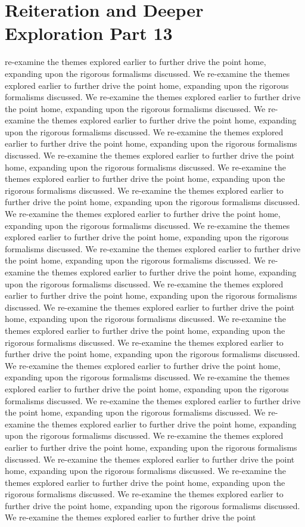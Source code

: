 \section{Reiteration and Deeper Exploration Part 13}\nWe re-examine the themes explored earlier to further drive the point home, expanding upon the rigorous formalisms discussed. We re-examine the themes explored earlier to further drive the point home, expanding upon the rigorous formalisms discussed. We re-examine the themes explored earlier to further drive the point home, expanding upon the rigorous formalisms discussed. We re-examine the themes explored earlier to further drive the point home, expanding upon the rigorous formalisms discussed. We re-examine the themes explored earlier to further drive the point home, expanding upon the rigorous formalisms discussed. We re-examine the themes explored earlier to further drive the point home, expanding upon the rigorous formalisms discussed. We re-examine the themes explored earlier to further drive the point home, expanding upon the rigorous formalisms discussed. We re-examine the themes explored earlier to further drive the point home, expanding upon the rigorous formalisms discussed. We re-examine the themes explored earlier to further drive the point home, expanding upon the rigorous formalisms discussed. We re-examine the themes explored earlier to further drive the point home, expanding upon the rigorous formalisms discussed. We re-examine the themes explored earlier to further drive the point home, expanding upon the rigorous formalisms discussed. We re-examine the themes explored earlier to further drive the point home, expanding upon the rigorous formalisms discussed. We re-examine the themes explored earlier to further drive the point home, expanding upon the rigorous formalisms discussed. We re-examine the themes explored earlier to further drive the point home, expanding upon the rigorous formalisms discussed. We re-examine the themes explored earlier to further drive the point home, expanding upon the rigorous formalisms discussed. We re-examine the themes explored earlier to further drive the point home, expanding upon the rigorous formalisms discussed. We re-examine the themes explored earlier to further drive the point home, expanding upon the rigorous formalisms discussed. We re-examine the themes explored earlier to further drive the point home, expanding upon the rigorous formalisms discussed. We re-examine the themes explored earlier to further drive the point home, expanding upon the rigorous formalisms discussed. We re-examine the themes explored earlier to further drive the point home, expanding upon the rigorous formalisms discussed. We re-examine the themes explored earlier to further drive the point home, expanding upon the rigorous formalisms discussed. We re-examine the themes explored earlier to further drive the point home, expanding upon the rigorous formalisms discussed. We re-examine the themes explored earlier to further drive the point home, expanding upon the rigorous formalisms discussed. We re-examine the themes explored earlier to further drive the point home, expanding upon the rigorous formalisms discussed. We re-examine the themes explored earlier to further drive the point 